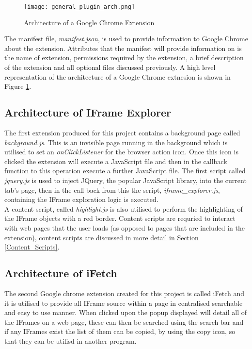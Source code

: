 \documentclass[12pt]{article}
\begin{document}
\begin{figure}[H]
    \centering
    \texttt{[image: general\_plugin\_arch.png]}
    \caption{Architecture of a Google Chrome Extension}
    \label{fig:general_plugin_arch}
\end{figure}

The manifest file, \textit{manifest.json}, is used to provide information to Google Chrome about the extension. Attributes that the manifest will provide information on is the name of extension, permissions required by the extension, a brief description of the extension and all optional files discussed previously. A high level representation of the architecture of a Google Chrome extnesion is shown in Figure \ref{fig:general_plugin_arch}. 

\subsection{Architecture of IFrame Explorer}
The first extension produced for this project contains a background page called \textit{background.js}. This is an invisible page running in the background which is utilised to set an \textit{onClickListener} for the browser action icon. Once this icon is clicked the extension will execute a JavaScript file and then in the callback function to this operation execute a further JavaScript file. The first script called \textit{jquery.js} is used to inject JQuery, the popular JavaScript library, into the current tab's page, then in the call back from this the script, \textit{iframe\_explorer.js}, containing the IFrame exploration logic is executed. \\

A content script, called \textit{highlight.js} is also utilised to perform the highlighting of the IFrame objects with a red border. Content scripts are requried to interact with web pages that the user loads (as opposed to pages that are included in the extension), content scripts are discussed in more detail in Section \ref{Content_Scripts}. 

\subsection{Architecture of iFetch}
The second Google chrome extension created for this project is called iFetch and it is utilised to provide all IFrame source within a page in centralised searchable and easy to use manner. When clicked upon the popup displayed will detail all of the IFrames on a web page, these can then be searched using the search bar and if any IFrames exist the list of them can be copied, by using the copy icon, so that they can be utilisd in another program. \\
\end{document}

